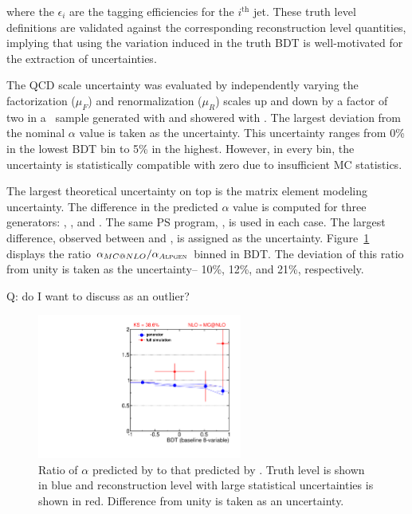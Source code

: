 \noindent where the $\epsilon_i$ are the tagging efficiencies for the
$i^{\textrm{th}}$ jet. These truth level definitions are validated
against the corresponding reconstruction level quantities, implying
that using the variation induced in the truth BDT is well-motivated for
the extraction of uncertainties. 

The QCD scale uncertainty was evaluated by independently varying the factorization
($\mu_F$) and renormalization ($\mu_R$) scales up and down by a factor
of two in a \ttbar~sample generated with \MCATNLO and showered
with \HERWIG. The largest deviation from the nominal $\alpha$ value is
taken as the uncertainty. This uncertainty ranges from 0\% in the
lowest BDT bin to 5\% in the highest. However, in every bin, the
uncertainty is statistically compatible with zero due to insufficient
MC statistics. 

The largest theoretical uncertainty on top is the matrix element
modeling uncertainty. The difference in the predicted $\alpha$ value
is computed for three generators: \MCATNLO, \POWHEG, and \ALPGEN. The
same PS program, \HERWIG, is used in each case. The largest difference,
observed between \MCATNLO and \ALPGEN, is assigned as the
uncertainty. Figure~\ref{chap:analysis:fig:alpha_ratio} displays the
ratio $\alpha_{MC@NLO}/\alpha_{A\textsc{lpgen}}$ binned in BDT. The deviation
of this ratio from unity is taken as the uncertainty-- 10\%, 12\%, and
21\%, respectively. 

Q: do I want to discuss \MCATNLO as an outlier?

\begin{figure}[h]
  \centering
  \includegraphics[width=0.6\textwidth]{fig/analysis/ttbar_sys_cjv_mcatnlo03.pdf}
   \caption{Ratio of $\alpha$ predicted by \ALPGEN to that predicted
  by \MCATNLO. Truth level is shown in blue and reconstruction level
  with large statistical uncertainties is shown in red. Difference
  from unity is taken as an uncertainty.}
  \label{chap:analysis:fig:alpha_ratio}
\end{figure}


